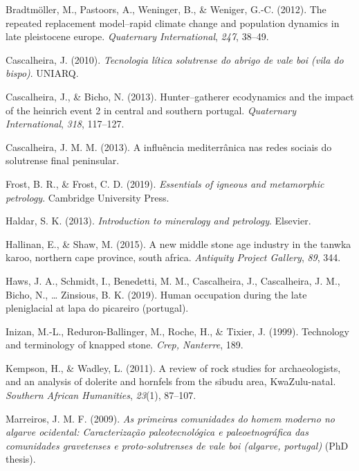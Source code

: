 \documentclass[12pt,twoside]{reedthesis}
\begin{document}
\leavevmode\hypertarget{ref-bradtmoller2012}{}%
Bradtmöller, M., Pastoors, A., Weninger, B., \& Weniger, G.-C. (2012). The repeated replacement model--rapid climate change and population dynamics in late pleistocene europe. \emph{Quaternary International}, \emph{247}, 38--49.

\leavevmode\hypertarget{ref-cascalheira2010}{}%
Cascalheira, J. (2010). \emph{Tecnologia lítica solutrense do abrigo de vale boi (vila do bispo)}. UNIARQ.

\leavevmode\hypertarget{ref-cascalheiraandbicho2013}{}%
Cascalheira, J., \& Bicho, N. (2013). Hunter--gatherer ecodynamics and the impact of the heinrich event 2 in central and southern portugal. \emph{Quaternary International}, \emph{318}, 117--127.

\leavevmode\hypertarget{ref-cascalheira2013}{}%
Cascalheira, J. M. M. (2013). A influência mediterrânica nas redes sociais do solutrense final peninsular.

\leavevmode\hypertarget{ref-frost2019}{}%
Frost, B. R., \& Frost, C. D. (2019). \emph{Essentials of igneous and metamorphic petrology}. Cambridge University Press.

\leavevmode\hypertarget{ref-haldar2013}{}%
Haldar, S. K. (2013). \emph{Introduction to mineralogy and petrology}. Elsevier.

\leavevmode\hypertarget{ref-hallinan2015}{}%
Hallinan, E., \& Shaw, M. (2015). A new middle stone age industry in the tanwka karoo, northern cape province, south africa. \emph{Antiquity Project Gallery}, \emph{89}, 344.

\leavevmode\hypertarget{ref-hawsetal2019}{}%
Haws, J. A., Schmidt, I., Benedetti, M. M., Cascalheira, J., Cascalheira, J. M., Bicho, N., \ldots{} Zinsious, B. K. (2019). Human occupation during the late pleniglacial at lapa do picareiro (portugal).

\leavevmode\hypertarget{ref-inizan1999}{}%
Inizan, M.-L., Reduron-Ballinger, M., Roche, H., \& Tixier, J. (1999). Technology and terminology of knapped stone. \emph{Crep, Nanterre}, 189.

\leavevmode\hypertarget{ref-kempson2011}{}%
Kempson, H., \& Wadley, L. (2011). A review of rock studies for archaeologists, and an analysis of dolerite and hornfels from the sibudu area, KwaZulu-natal. \emph{Southern African Humanities}, \emph{23}(1), 87--107.

\leavevmode\hypertarget{ref-marreiros2009}{}%
Marreiros, J. M. F. (2009). \emph{As primeiras comunidades do homem moderno no algarve ocidental: Caracterização paleotecnológica e paleoetnográfica das comunidades gravetenses e proto-solutrenses de vale boi (algarve, portugal)} (PhD thesis).
\end{document}
